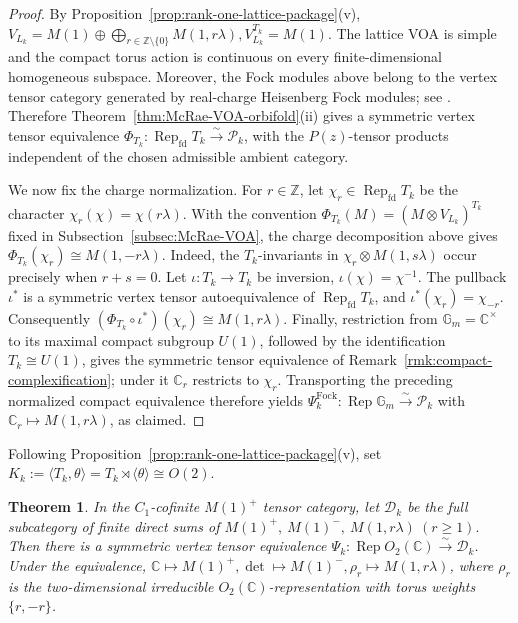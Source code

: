 \documentclass[10pt,a4paper]{amsart}
\numberwithin{equation}{section} \newtheorem{thm}{Theorem}[section] \newtheorem{lem}[thm]{Lemma} \newtheorem{ex}[thm]{Example} \newtheorem{prop}[thm]{Proposition} \newtheorem{cor}[thm]{Corollary} \newtheorem{defi}[thm]{Definition} \newtheorem{rmk}[thm]{Remark} \newtheorem{notation}[thm]{Notation}
\newcommand{\Rep}{\operatorname{Rep}}
\newcommand{\Dk}{\mathcal D_k}
\newcommand{\Otwo}{O_2(\C)}
\def\Z{\mathbb{Z}} \def\N{\mathbb{N}} \def\A{\mathbb{A}} \def\C{\mathbb{C}} \def\R{\mathbb{R}} \def\Q{\mathbb{Q}} \def\F{\mathbb{F}}
\begin{document}
\begin{proof}
By Proposition~\ref{prop:rank-one-lattice-package}(v), \(V_{L_k}=M(1)\oplus\bigoplus_{r\in\Z\setminus\{0\}}M(1,r\lambda), V_{L_k}^{T_k}=M(1)\). The lattice VOA is simple and the compact torus action is continuous on every finite-dimensional homogeneous subspace. Moreover, the Fock modules above belong to the vertex tensor category generated by real-charge Heisenberg Fock modules; see \cite[Theorem~2.3]{CKLR}. Therefore Theorem~\ref{thm:McRae-VOA-orbifold}(ii) gives a symmetric vertex tensor equivalence \(\Phi_{T_k}:\Rep_{\mathrm{fd}}T_k\overset{\sim}{\longrightarrow}\mathcal P_k\), with the $P(z)$-tensor products independent of the chosen admissible ambient category.

We now fix the charge normalization. For \(r\in\Z\), let \(\chi_r\in\Rep_{\mathrm{fd}}T_k\) be the character \(\chi_r(\chi)=\chi(r\lambda)\). With the convention \(\Phi_{T_k}(M)=(M\otimes V_{L_k})^{T_k}\) fixed in Subsection~\ref{subsec:McRae-VOA}, the charge decomposition above gives \(\Phi_{T_k}(\chi_r)\cong M(1,-r\lambda)\). Indeed, the $T_k$-invariants in \(\chi_r\otimes M(1,s\lambda)\) occur precisely when \(r+s=0\). Let \(\iota:T_k\to T_k\) be inversion, \(\iota(\chi)=\chi^{-1}\). The pullback \(\iota^*\) is a symmetric vertex tensor autoequivalence of \(\Rep_{\mathrm{fd}}T_k\), and \(\iota^*(\chi_r)=\chi_{-r}\). Consequently \((\Phi_{T_k}\circ\iota^*)(\chi_r)\cong M(1,r\lambda)\). Finally, restriction from \(\mathbb G_m=\C^\times\) to its maximal compact subgroup $U(1)$, followed by the identification $T_k\cong U(1)$, gives the symmetric tensor equivalence of Remark~\ref{rmk:compact-complexification}; under it \(\C_r\) restricts to \(\chi_r\). Transporting the preceding normalized compact equivalence therefore yields \(\Psi_k^{\mathrm{Fock}}:\Rep\mathbb G_m\overset\sim\longrightarrow\mathcal P_k\) with \(\C_r\mapsto M(1,r\lambda)\), as claimed.
\end{proof}

Following Proposition~\ref{prop:rank-one-lattice-package}(v), set \(K_k:=\langle T_k,\theta\rangle=T_k\rtimes\langle\theta\rangle\cong O(2)\).
\begin{thm}\label{thm:O2-category}
In the $C_1$-cofinite $M(1)^+$ tensor category, let $\Dk$ be the full subcategory of finite direct sums of \(M(1)^+,\ M(1)^-,\ M(1,r\lambda)\ (r\ge1).\) Then there is a symmetric vertex tensor equivalence \(\Psi_k:\Rep\Otwo\overset\sim\longrightarrow\Dk\). Under the equivalence, \(\C\longmapsto M(1)^+,\det\longmapsto M(1)^-,\rho_r\longmapsto M(1,r\lambda)\), where $\rho_r$ is the two-dimensional irreducible $\Otwo$-representation with torus weights $\{r,-r\}$.
\end{thm}
\end{document}
